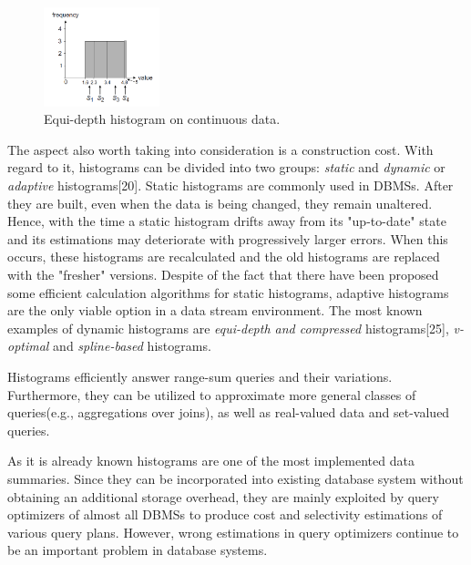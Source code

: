 \documentclass[10pt, conference, compsocconf]{IEEEtran}
\begin{document}
\label{fig:equi-depth_histograms}
\begin{figure} \includegraphics[width=0.3\textwidth, center]{img/equi-depth_histogram.png} 
\caption[Equi-depth histogram on continuous data.]%
{Equi-depth histogram on continuous data.\footnotemark}
\end{figure}

The aspect also worth taking into consideration is a construction cost. With regard to it, histograms can be divided into two groups: \textit{static} and \textit{dynamic} or \textit{adaptive} histograms[20]. Static histograms are commonly used in DBMSs. After they are built, even when the data is being changed, they remain unaltered. Hence, with the time a static histogram drifts away from its "up-to-date" state and its estimations may deteriorate with progressively larger errors. When this occurs, these histograms are recalculated and the old histograms are replaced with the "fresher" versions. 
Despite of the fact that there have been proposed some efficient calculation algorithms for static histograms, adaptive histograms are the only viable option in a data stream environment. The most known examples of dynamic histograms are \textit{equi-depth and compressed} histograms[25], \textit{v-optimal} and \textit{spline-based} histograms. 

Histograms efficiently answer range-sum queries and their variations. Furthermore, they can be utilized to approximate more general classes of queries(e.g., aggregations over joins), as well as real-valued data and set-valued queries.
  
As it is already known histograms are one of the most implemented data summaries. Since they can be incorporated into existing database system without obtaining an additional storage overhead, they are mainly exploited by query optimizers of almost all DBMSs to produce cost and selectivity estimations of various query plans. However, wrong estimations in query optimizers continue to be an important problem in database systems.\\
\end{document}
